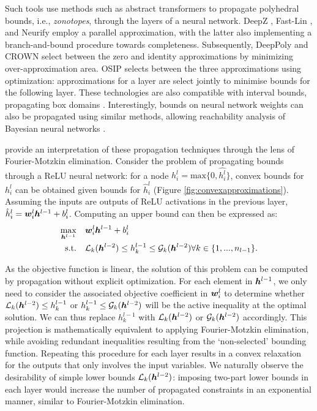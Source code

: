 Such tools use methods such as abstract transformers to propagate polyhedral bounds, i.e., \textit{zonotopes}, through the layers of a  neural network. 
DeepZ \citep{singh2018fast}, Fast-Lin \citep{weng2018towards}, and Neurify \citep{wang2018efficient} employ a parallel approximation, with the latter also implementing a branch-and-bound procedure towards completeness. 
Subsequently, DeepPoly \citep{singh2019abstract}  and CROWN \citep{zhang2018efficient} select between the zero and identity approximations by minimizing over-approximation area. 
OSIP \citep{hashemi2021osip} selects between the three approximations using optimization: approximations for a layer are select jointly to minimise bounds for the following layer. 
These technologies are also compatible with interval bounds, propagating box domains \citep{mirman2018differentiable}. 
Interestingly, bounds on neural network weights can also be propagated using similar methods, allowing reachability analysis of Bayesian neural networks \citep{wicker2020probabilistic}. 

\cite{tjandraatmadja2020convex} provide an interpretation of these propagation techniques through the lens of Fourier-Motzkin elimination. 
Consider the problem of propagating bounds through a ReLU neural network: for a node $h_i^l = \mathrm{max} \{0, \hat{h_i^l} \}$, convex bounds for $h_i^l$ can be obtained given bounds for $\hat{h}_i^l$ (Figure \ref{fig:convexapproximations}). Assuming the inputs are outputs of ReLU activations in the previous layer, $\hat{h}_i^l = {\bm{w}}_i^l {\bm{h}}^{l-1} + b_i^l$. 
Computing an upper bound can then be expressed as:
\begin{equation*}
    \begin{aligned}
    \max_{{\bm{h}}^{l-1}} \quad& {\bm{w}}_i^l {\bm{h}}^{l-1} + b_i^l \\
    \text{s.t.} \quad& \mathcal{L}_k({\bm{h}}^{l-2}) \leq h^{l-1}_k \leq \mathcal{G}_k({\bm{h}}^{l-2}) \forall k \in \{ 1,...,n_{l-1} \}.
    \end{aligned}
\end{equation*}

As the objective function is linear, the solution of this problem can be computed by propagation without explicit optimization. 
For each element in ${\bm{h}}^{l-1}$, we only need to consider the associated objective coefficient in ${\bm{w}}_i^l$ to determine whether $\mathcal{L}_k({\bm{h}}^{l-2}) \leq h^{l-1}_k$ or $h^{l-1}_k \leq \mathcal{G}_k({\bm{h}}^{l-2})$ will be the active inequality at the optimal solution. 
We can thus replace $h^{l-1}_k$ with $\mathcal{L}_k({\bm{h}}^{l-2})$ or $\mathcal{G}_k({\bm{h}}^{l-2})$ accordingly. 
This projection is mathematically equivalent to applying Fourier-Motzkin elimination, while avoiding redundant inequalities resulting from the `non-selected' bounding function. 
Repeating this procedure for each layer results in a convex relaxation for the outputs that only involves the input variables.
We naturally observe the desirability of simple lower bounds $\mathcal{L}_k({\bm{h}}^{l-2})$: imposing two-part lower bounds in each layer would increase the number of propagated constraints in an exponential manner, similar to Fourier-Motzkin elimination. 

